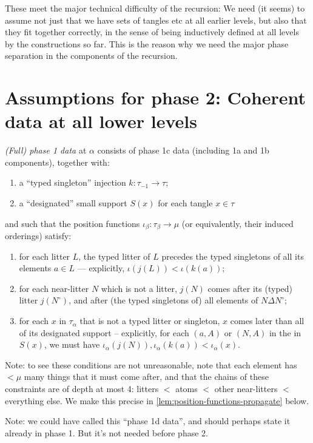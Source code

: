 These meet the major technical difficulty of the recursion: We need (it seems) to assume not just that we have sets of tangles etc at all earlier levels, but also that they fit together correctly, in the sense of being inductively defined at all levels by the constructions so far.  This is the reason why we need the major phase separation in the components of the recursion.

\section{Assumptions for phase 2: Coherent data at all lower levels}

\begin{definition}
  \label{def:full-phase-1-data}
  \emph{(Full) phase 1 data} at $\alpha$ consists of phase 1c data (including 1a and 1b components), together with:
  \begin{enumerate}
    \item a “typed singleton” injection $k : \tau_{-1} \to \tau$;
    \item a “designated” small support $S(x)$ for each tangle $x \in \tau$
  \end{enumerate}
  and such that the position functions $\iota_\beta : \tau_\beta \to \mu$ (or equivalently, their induced orderings) satisfy:
  \begin{enumerate}
    \item for each litter $L$, the typed litter of $L$ precedes the typed singletons of all its elements $a \in L$ --- explicitly, $\iota(j(L)) < \iota(k(a))$;
    \item for each near-litter $N$ which is not a litter, $j(N)$ comes after its (typed) litter $j(N^\circ)$, and after (the typed singletons of) all elements of $N \Delta N^\circ$;

    \item for each $x$ in $\tau_\alpha$ that is not a typed litter or singleton, $x$ comes later than all of its designated support -- explicitly, for each $(a,A)$ or $(N,A)$ in the in $S(x)$, we must have $\iota_\alpha(j(N)), \iota_\alpha(k(a))<\iota_\alpha(x)$.
  \end{enumerate}

  Note: to see these conditions are not unreasonable, note that each element has $<\mu$ many things that it must come after, and that the chains of these constraints are of depth at most 4: litters $<$ atoms $<$ other near-litters $<$ everything else.  We make this precise in \cref{lem:position-functions-propagate} below.

  Note: we could have called this “phase 1d data”, and should perhaps state it already in phase 1.  But it’s not needed before phase 2.
\end{definition}

